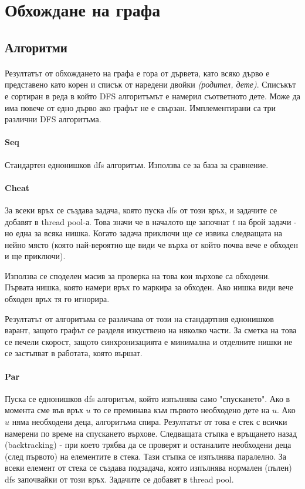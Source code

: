 \section{Обхождане на графа}

\subsection{Алгоритми}

\paragraph*{} Резултатът от обхождането на графа е гора от дървета, като всяко дърво е представено като корен и списък от наредени двойки \textit{(родител, дете)}. Списъкът е сортиран в реда в който DFS алгоритъмът е намерил съответното дете. Може да има повече от едно дърво ако графът не е свързан. Имплементирани са три различни DFS алгоритъма.

\paragraph*{Seq} Стандартен еднонишков dfs алгоритъм. Използва се за база за сравнение.

\paragraph*{Cheat} За всеки връх се създава задача, която пуска dfs от този връх, и задачите се добавят в thread pool-а. Това значи че в началото ще започнат $t$ на брой задачи - но една за всяка нишка. Когато задача приключи ще се извика следващата на нейно място (която най-вероятно ще види че върха от който почва вече е обходен и ще приключи).

Използва се споделен масив за проверка на това кои върхове са обходени. Първата нишка, която намери връх го маркира за обходен. Ако нишка види вече обходен връх тя го игнорира.

Резултатът от алгоритъма се различава от този на стандартния еднонишков варант, защото графът се разделя изкуствено на няколко части. За сметка на това се печели скорост, защото синхронизацията е минимална и отделните нишки не се застъпват в работата, която вършат.

\paragraph*{Par} Пуска се еднонишков dfs алгоритъм, който изпълнява само "спускането". Ако в момента сме във връх $u$  то се преминава към първото необходено дете на $u$. Ако $u$ няма необходени деца, алгоритъма спира. Резултатът от това е стек с всички намерени по време на спускането върхове. Следващата стъпка е връщането назад (backtracking) - при което трябва да се проверят и останалите необходени деца (след първото) на елементите в стека. Тази стъпка се изпълнява паралелно. За всеки елемент от стека се създава подзадача, която изпълнява нормален (пълен) dfs започвайки от този връх. Задачите се добавят в thread pool.

